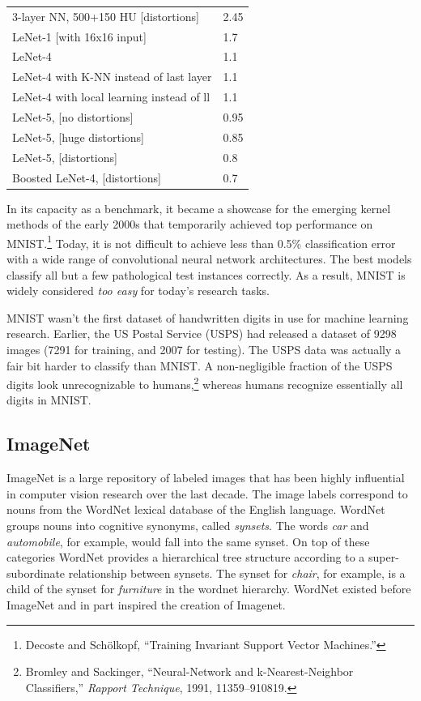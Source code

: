 \documentclass{tufte-book}
\begin{document}
\begin{longtable}[]{@{}ll@{}}
3-layer NN, 500+150 HU {[}distortions{]} & 2.45 \\
LeNet-1 {[}with 16x16 input{]} & 1.7 \\
LeNet-4 & 1.1 \\
LeNet-4 with K-NN instead of last layer & 1.1 \\
LeNet-4 with local learning instead of ll & 1.1 \\
LeNet-5, {[}no distortions{]} & 0.95 \\
LeNet-5, {[}huge distortions{]} & 0.85 \\
LeNet-5, {[}distortions{]} & 0.8 \\
Boosted LeNet-4, {[}distortions{]} & 0.7 \\
\bottomrule
\end{longtable}

In its capacity as a benchmark, it became a showcase for the emerging
kernel methods of the early 2000s that temporarily achieved top
performance on MNIST.\footnote{Decoste and Schölkopf, {``Training
  Invariant Support Vector Machines.''}} Today, it is not difficult to
achieve less than 0.5\% classification error with a wide range of
convolutional neural network architectures. The best models classify all
but a few pathological test instances correctly. As a result, MNIST is
widely considered \emph{too easy} for today's research tasks.

MNIST wasn't the first dataset of handwritten digits in use for machine
learning research. Earlier, the US Postal Service (USPS) had released a
dataset of 9298 images (7291 for training, and 2007 for testing). The
USPS data was actually a fair bit harder to classify than MNIST. A
non-negligible fraction of the USPS digits look unrecognizable to
humans,\footnote{Bromley and Sackinger, {``Neural-Network and
  k-Nearest-Neighbor Classifiers,''} \emph{Rapport Technique}, 1991,
  11359--910819.} whereas humans recognize essentially all digits in
MNIST.

\hypertarget{imagenet}{%
\subsection{ImageNet}\label{imagenet}}

ImageNet is a large repository of labeled images that has been highly
influential in computer vision research over the last decade. The image
labels correspond to nouns from the WordNet lexical database of the
English language. WordNet groups nouns into cognitive synonyms, called
\emph{synsets}. The words \emph{car} and \emph{automobile}, for example,
would fall into the same synset. On top of these categories WordNet
provides a hierarchical tree structure according to a super-subordinate
relationship between synsets. The synset for \emph{chair}, for example,
is a child of the synset for \emph{furniture} in the wordnet hierarchy.
WordNet existed before ImageNet and in part inspired the creation of
Imagenet.
\end{document}
